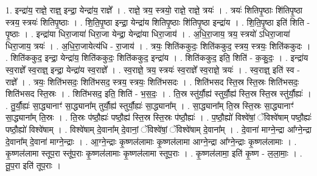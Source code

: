 \documentclass[17pt]{extarticle}
\begin{document}
1. इन्द्रा॑य॒ राज्ञे॒ राज्ञ्॒ इन्द्रा॒ येन्द्रा॑य॒ राज्ञे᳚ । . राज्ञे॒ त्रय॒ स्त्रयो॒ राज्ञे॒ राज्ञे॒ त्रयः॑ । . त्रयः॑ शितिपृ॒ष्ठाः शि॑तिपृ॒ष्ठा स्त्रय॒ स्त्रयः॑ शितिपृ॒ष्ठाः । . शि॒ति॒पृ॒ष्ठा इन्द्रा॒ येन्द्रा॑य शितिपृ॒ष्ठाः शि॑तिपृ॒ष्ठा इन्द्रा॑य । . शि॒ति॒पृ॒ष्ठा इति॑ शिति - पृ॒ष्ठाः । . इन्द्रा॑या धिरा॒जाया॑ धिरा॒जा येन्द्रा॒ येन्द्रा॑या धिरा॒जाय॑ । . अ॒धि॒रा॒जाय॒ त्रय॒ स्त्रयो॑ ऽधिरा॒जाया॑ धिरा॒जाय॒ त्रयः॑ । . अ॒धि॒रा॒जायेत्य॑धि - रा॒जाय॑ । . त्रयः॒ शिति॑ककुदः॒ शिति॑ककुद॒ स्त्रय॒ स्त्रयः॒ शिति॑ककुदः । . शिति॑ककुद॒ इन्द्रा॒ येन्द्रा॑य॒ शिति॑ककुदः॒ शिति॑ककुद॒ इन्द्रा॑य । . शिति॑ककुद॒ इति॒ शिति॑ - क॒कु॒दः॒ । . इन्द्रा॑य स्व॒राज्ञे᳚ स्व॒राज्ञ्॒ इन्द्रा॒ येन्द्रा॑य स्व॒राज्ञे᳚ । . स्व॒राज्ञे॒ त्रय॒ स्त्रयः॑ स्व॒राज्ञे᳚ स्व॒राज्ञे॒ त्रयः॑ । . स्व॒राज्ञ्॒ इति॑ स्व - राज्ञे᳚ । . त्रयः॒ शिति॑भसदः॒ शिति॑भसद॒ स्त्रय॒ स्त्रयः॒ शिति॑भसदः । . शिति॑भसद स्ति॒स्र स्ति॒स्रः शिति॑भसदः॒ शिति॑भसद स्ति॒स्रः । . शिति॑भसद॒ इति॒ शिति॑ - भ॒स॒दः॒ । . ति॒स्र स्तु॑र्यौ॒ह्य॑ स्तुर्यौ॒ह्य॑ स्ति॒स्र स्ति॒स्र स्तु॑र्यौ॒ह्यः॑ । . तु॒र्यौ॒ह्यः॑ सा॒द्ध्यानाꣳ॑ सा॒द्ध्याना᳚म् तुर्यौ॒ह्य॑ स्तुर्यौ॒ह्यः॑ सा॒द्ध्याना᳚म् । . सा॒द्ध्याना᳚म् ति॒स्र स्ति॒स्रः सा॒द्ध्यानाꣳ॑ सा॒द्ध्याना᳚म् ति॒स्रः । . ति॒स्रः प॑ष्ठौ॒ह्यः॑ पष्ठौ॒ह्य॑ स्ति॒स्र स्ति॒स्रः प॑ष्ठौ॒ह्यः॑ । . प॒ष्ठौ॒ह्यो॑ विश्वे॑षां॒ ॅविश्वे॑षाम् पष्ठौ॒ह्यः॑ पष्ठौ॒ह्यो॑ विश्वे॑षाम् । . विश्वे॑षाम् दे॒वाना᳚म् दे॒वानां॒ ॅविश्वे॑षां॒ ॅविश्वे॑षाम् दे॒वाना᳚म् । . दे॒वाना॑ माग्ने॒न्द्रा आ᳚ग्ने॒न्द्रा दे॒वाना᳚म् दे॒वाना॑ माग्ने॒न्द्राः । . आ॒ग्ने॒न्द्राः कृ॒ष्णल॑लामाः कृ॒ष्णल॑लामा आग्ने॒न्द्रा आ᳚ग्ने॒न्द्राः कृ॒ष्णल॑लामाः । . कृ॒ष्णल॑लामा स्तूप॒रा स्तू॑प॒राः कृ॒ष्णल॑लामाः कृ॒ष्णल॑लामा स्तूप॒राः । . कृ॒ष्णल॑लामा॒ इति॑ कृ॒ष्ण - ल॒ला॒माः॒ । . तू॒प॒रा इति॑ तूप॒राः । \newline
\end{document}

